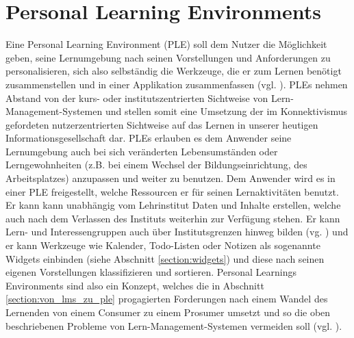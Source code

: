 \section{Personal Learning Environments}\label{section:ple_intro}
Eine Personal Learning Environment (PLE) soll dem Nutzer die Möglichkeit geben, seine Lernumgebung nach seinen Vorstellungen und Anforderungen zu personalisieren, sich also selbständig die Werkzeuge, die er zum Lernen benötigt zusammenstellen und in einer Applikation zusammenfassen (vgl. \cite{VanHarmelen}). PLEs nehmen Abstand von der kurs- oder institutszentrierten Sichtweise von Lern-Management-Systemen und stellen somit eine Umsetzung der im Konnektivismus gefordeten nutzerzentrierten Sichtweise auf das Lernen in unserer heutigen Informationsgesellschaft dar. PLEs erlauben es dem Anwender seine Lernumgebung auch bei sich veränderten Lebensumständen oder Lerngewohnheiten (z.B. bei einem Wechsel der Bildungseinrichtung, des Arbeitsplatzes) anzupassen und weiter zu benutzen. Dem Anwender wird es in einer PLE freigestellt, welche Ressourcen er für seinen Lernaktivitäten benutzt. Er kann kann unabhängig vom Lehrinstitut Daten und Inhalte erstellen, welche auch nach dem Verlassen des Instituts weiterhin zur Verfügung stehen. Er kann Lern- und Interessengruppen auch über Institutsgrenzen hinweg bilden (vg. \cite{Schaffert2008a}) und er kann Werkzeuge wie Kalender, Todo-Listen oder Notizen als sogenannte Widgets einbinden (siehe Abschnitt \ref{section:widgets}) und diese nach seinen eigenen Vorstellungen klassifizieren und sortieren. Personal Learnings Environments sind also ein Konzept, welches die in Abschnitt \ref{section:von_lms_zu_ple} progagierten Forderungen nach einem Wandel des Lernenden von einem Consumer zu einem Prosumer umsetzt und so die oben beschriebenen Probleme von Lern-Management-Systemen vermeiden soll (vgl. \cite{Attwell2007}).

